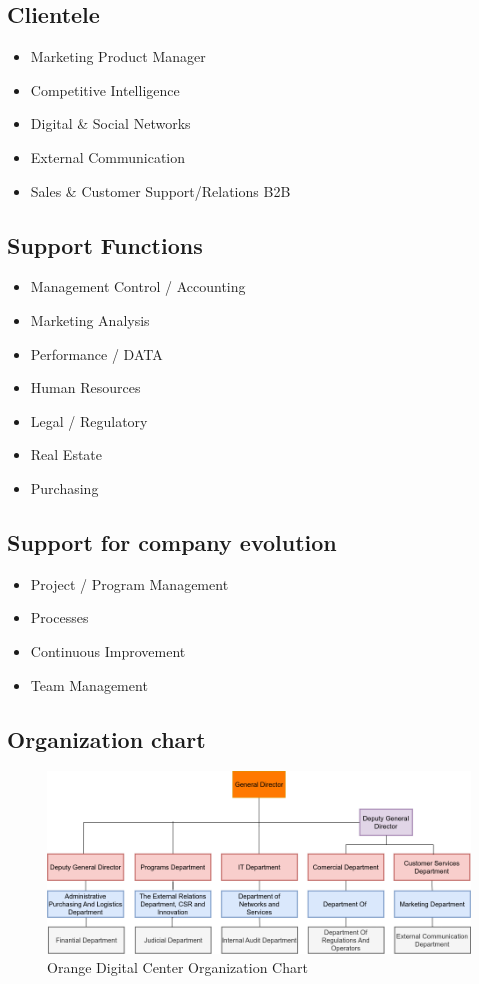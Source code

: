 \subsection{Clientele}
\begin{itemize}
      \item Marketing Product Manager
      \item Competitive Intelligence
      \item Digital \& Social Networks
      \item External Communication
      \item Sales \& Customer Support/Relations B2B
\end{itemize}

\subsection{Support Functions}
\begin{itemize}
      \item Management Control / Accounting
      \item Marketing Analysis
      \item Performance / DATA
      \item Human Resources
      \item Legal / Regulatory
      \item Real Estate
      \item Purchasing
\end{itemize}

\subsection{Support for company evolution}
\begin{itemize}
      \item Project / Program Management
      \item Processes
      \item Continuous Improvement
      \item Team Management
\end{itemize}

\subsection{Organization chart}
\begin{figure}[h!]
      \centering
      \includegraphics[width=1\textwidth]{../images/orgChart.png}
      \caption{Orange Digital Center Organization Chart}
      \label{fig:Orange Digital Center Organization Chart}
\end{figure}

